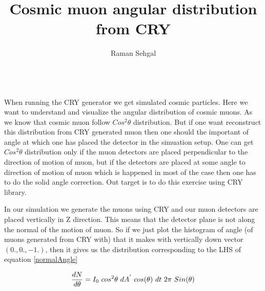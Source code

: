 \documentclass[a4paper,10pt]{article}
\title{Cosmic muon angular distribution from CRY}
\author{Raman Sehgal}
\begin{document}
\\

When running the CRY generator we get simulated cosmic particles. Here we want to understand and visualize the angular distribution of cosmic muons. As we know that cosmic muon follow $Cos^{2}\theta$ distribution. But if one want reconstruct this distribution from CRY generated muon then one should the important of angle at which one has placed the detector in the simuation setup. One can get  $Cos^{2}\theta$ distribution only if the muon detectors are placed perpendicular to the direction of motion of muon, but if the detectors are placed at some angle to direction of motion of muon which is happened in most of the case then one has to do the solid angle correction. Out target is to do this exercise using CRY library.

In our simulation we generate the muons using CRY and our muon detectors are placed vertically in Z direction. This means that the detector plane is not along the normal of the motion of muon. So if we just plot the histogram of angle (of muons generated from CRY with) that it makes with vertically down vector $(0.,0.,-1.)$, then it gives us the distribution corresponding to the LHS of equation \ref{normalAngle}

\begin{equation} \label{normalAngle}
   \centering{ \frac{dN}{d\theta} = I_{0} \ cos^{2}\theta \ dA^{'}\ cos(\theta) \ dt  \ 2\pi  \ Sin(\theta)}  
\end{equation}

\begin{figure}[!htb]

\end{figure}
\end{document}

